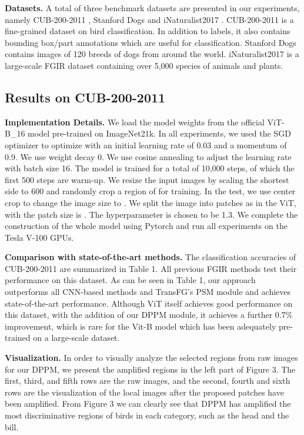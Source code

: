 \documentclass[sigconf]{acmart}
\begin{document}
\textbf{Datasets.} A total of three benchmark datasets are presented in our experiments, namely CUB-200-2011 \cite{CUB}, Stanford Dogs \cite{Stanford_dogs} and iNaturalist2017 \cite{iNat}. CUB-200-2011 is a fine-grained dataset on bird classification. In addition to labels, it also contains bounding box/part annotations which are useful for classification. Stanford Dogs contains images of 120 breeds of dogs from around the world. iNaturalist2017 is a large-scale FGIR dataset containing over 5,000 species of animals and plants.

\subsection{Results on CUB-200-2011}


\textbf{Implementation Details.} We load the model weights from the official ViT-B\_16 model pre-trained on ImageNet21k. In all experiments, we used the SGD optimizer to optimize with an initial learning rate of 0.03 and a momentum of 0.9. We use weight decay 0.  We use cosine annealing to adjust the learning rate with batch size 16. The model is trained for a total of 10,000 steps, of which the first 500 steps are warm-up. We resize the input images by scaling the shortest side to 600 and randomly crop a region of  for training. In the test, we use center crop to change the image size to . We split the image into patches as in the ViT, with the patch size is . The hyperparameter  is chosen to be 1.3. We complete the construction of the whole model using Pytorch and run all experiments on the Tesla V-100 GPUs.

\textbf{Comparison with state-of-the-art methods.} The classification accuracies of CUB-200-2011 are summarized in Table 1. All previous FGIR methods test their performance on this dataset. As can be seen in Table 1, our approach outperforms all CNN-based methods and TransFG's PSM module and achieves state-of-the-art performance. Although ViT itself achieves good performance on this dataset, with the addition of our DPPM module, it achieves a further 0.7\% improvement, which is rare for the Vit-B model which has been adequately pre-trained on a large-scale dataset.

\textbf{Visualization.}
    In order to visually analyze the selected regions from raw images for our DPPM, we present the amplified regions in the left part of Figure 3. The first, third, and fifth rows are the raw images, and the second, fourth and sixth rows are the visualization of the local images after the proposed patches have been amplified. From Figure 3 we can clearly see that DPPM has amplified the most discriminative regions of birds in each category, such as the head and the bill.
\end{document}
